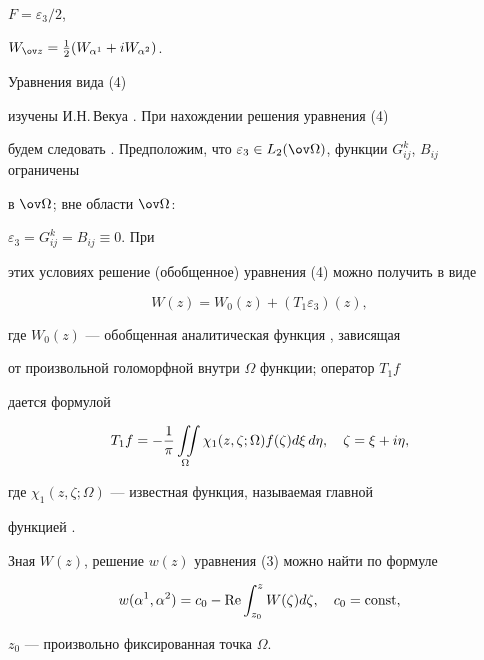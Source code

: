 $F=\varepsilon_3/2$, 


$W_{\ov z}=\tfrac{1}{2}(W_{\alpha^1}+iW_{\alpha^2})$. 


 


Уравнения вида (4)


изучены И.Н.\,Векуа \cite{3}. При нахождении решения уравнения (4) 


будем следовать \cite{3}. Предположим, что $\varepsilon_3\in 


L_2(\ov\Omega)$, функции $G^k_{ij}$, $B_{ij}$ ограничены 


в $\ov\Omega$; вне области $\ov\Omega$:


$\varepsilon_3=G^k_{ij}=B_{ij}\equiv 0$. При 


этих условиях решение (обобщенное) уравнения (4) можно получить в виде 


\begin{equation} 


W(z)=W_0(z)+(T_1\varepsilon_3)(z), 


\end{equation} 


где $W_0(z)$ --- обобщенная аналитическая функция \cite{3}, зависящая 


от произвольной голоморфной внутри $\Omega$ функции; оператор $T_1f$ 


дается формулой 


\begin{equation} 


T_1f=-\frac{1}{\pi}\intO \chi_1(z,\zeta;\Omega)f(\zeta) 


d\xi\,d\eta,\quad \zeta=\xi+i\eta, 


\end{equation} 


где $\chi_1(z,\zeta;\Omega)$ --- известная функция, называемая главной 


функцией \cite{3}. 


 


Зная $W(z)$, решение $w(z)$ уравнения (3) можно найти по формуле 


\begin{equation} 


w(\alpha^1,\alpha^2)=c_0-\re\int^z_{z_0}W(\zeta)d\zeta,\quad 


c_0=\const, 


\end{equation} 


$z_0$ --- произвольно фиксированная точка $\Omega$. 


